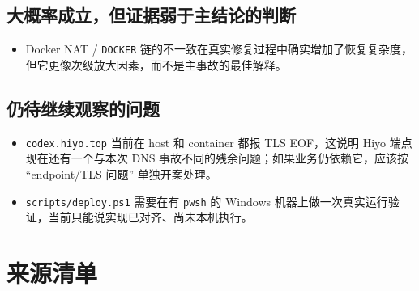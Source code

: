 \documentclass[a4paper]{article}
\begin{document}
\subsection{大概率成立，但证据弱于主结论的判断}

\begin{itemize}
\item Docker NAT / \texttt{DOCKER} 链的不一致在真实修复过程中确实增加了恢复复杂度，但它更像次级放大因素，而不是主事故的最佳解释。
\end{itemize}

\subsection{仍待继续观察的问题}

\begin{itemize}
\item \texttt{codex.hiyo.top} 当前在 host 和 container 都报 TLS EOF，这说明 Hiyo 端点现在还有一个与本次 DNS 事故不同的残余问题；如果业务仍依赖它，应该按 ``endpoint/TLS 问题'' 单独开案处理。
\item \texttt{scripts/deploy.ps1} 需要在有 \texttt{pwsh} 的 Windows 机器上做一次真实运行验证，当前只能说实现已对齐、尚未本机执行。
\end{itemize}

\appendix

\section{来源清单}
\end{document}

